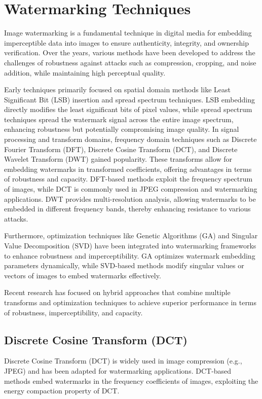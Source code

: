 \section{Watermarking Techniques}

Image watermarking is a fundamental technique in digital media for embedding imperceptible data into images to ensure authenticity, integrity, and ownership verification. Over the years, various methods have been developed to address the challenges of robustness against attacks such as compression, cropping, and noise addition, while maintaining high perceptual quality.

Early techniques primarily focused on spatial domain methods like Least Significant Bit (LSB) insertion and spread spectrum techniques. LSB embedding directly modifies the least significant bits of pixel values, while spread spectrum techniques spread the watermark signal across the entire image spectrum, enhancing robustness but potentially compromising image quality. In signal processing and transform domains, frequency domain techniques such as Discrete Fourier Transform (DFT), Discrete Cosine Transform (DCT), and Discrete Wavelet Transform (DWT) gained popularity. These transforms allow for embedding watermarks in transformed coefficients, offering advantages in terms of robustness and capacity. DFT-based methods exploit the frequency spectrum of images, while DCT is commonly used in JPEG compression and watermarking applications. DWT provides multi-resolution analysis, allowing watermarks to be embedded in different frequency bands, thereby enhancing resistance to various attacks.

Furthermore, optimization techniques like Genetic Algorithms (GA) and Singular Value Decomposition (SVD) have been integrated into watermarking frameworks to enhance robustness and imperceptibility. GA optimizes watermark embedding parameters dynamically, while SVD-based methods modify singular values or vectors of images to embed watermarks effectively.

Recent research has focused on hybrid approaches that combine multiple transforms and optimization techniques to achieve superior performance in terms of robustness, imperceptibility, and capacity.

\subsection{Discrete Cosine Transform (DCT)}

Discrete Cosine Transform (DCT) is widely used in image compression (e.g., JPEG) and has been adapted for watermarking applications. DCT-based methods embed watermarks in the frequency coefficients of images, exploiting the energy compaction property of DCT.

